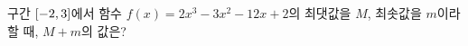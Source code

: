 구간 $[-2{,}\mkern3mu\mathopen{}3]$에서 함수 $f(x)=2x^3-3x^2-12x+2$의 최댓값을 $M$, 최솟값을 $m$이라 할 때, $M+m$의 값은?
